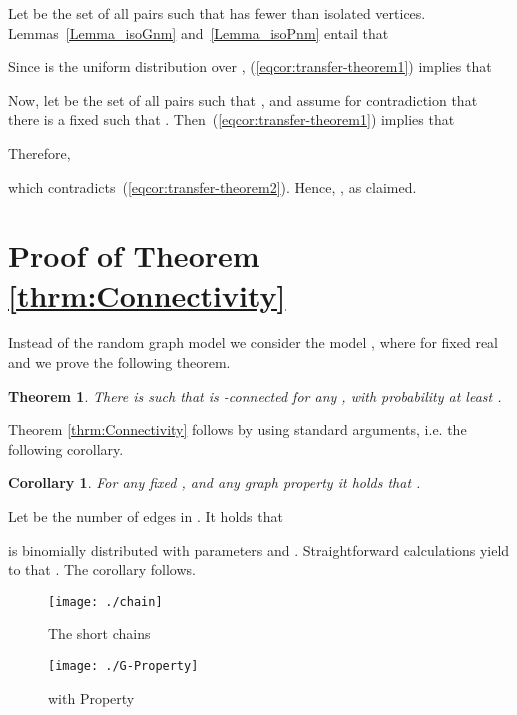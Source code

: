 \documentclass[a4paper,10pt]{article}
\makeatletter
\newcommand{\qed}{\hfill\smallskip}
\newtheorem{corollary}{Corollary}\renewcommand{\thecorollary}{\arabic{corollary}}
\newtheorem{theorem}{Theorem}\renewcommand{\thetheorem}{\arabic{theorem}}
\newenvironment{proof}{\noindent{\bf Proof\@:}}{\hfill \\}
\newcommand\Lem{Lemma}
\makeatother
\begin{document}
Let  be the set of all pairs 
such that  has fewer than  isolated vertices. \Lem s~\ref{Lemma_isoGnm} and~\ref{Lemma_isoPnm} entail that 

Since  is the uniform distribution over ,
(\ref{eqcor:transfer-theorem1}) implies that 

Now, let  be the set of all pairs
 such that 	,
and assume for contradiction that there is a fixed  such
that . Then~(\ref{eqcor:transfer-theorem1})
implies that

Therefore,

which contradicts~(\ref{eqcor:transfer-theorem2}). Hence, ,
as claimed.
\qed








\section{Proof of Theorem \ref{thrm:Connectivity}}\label{section:thrm:Connectivity}


Instead of the random graph model   we consider the model , 
where  for fixed real  and we prove the following theorem.

\begin{theorem}\label{thrm:ConnectivityGnp}
There is  such that  is -connected 
for any , with probability at least 
.
\end{theorem}

\noindent
Theorem \ref{thrm:Connectivity} follows by using standard arguments, i.e. the following corollary.
\begin{corollary}
For any fixed ,  and any graph property  it holds that
.
\end{corollary}  
\begin{proof}
Let  be the number of edges in . It holds that

 is binomially distributed with parameters  and .
Straightforward calculations yield to that .
The corollary follows.
\end{proof}



\begin{figure}
\begin{minipage}{0.5\textwidth}
	\centering
		\texttt{[image: ./chain]}
	\caption{ The short chains}
	\label{fig:Chains}
\end{minipage}
\begin{minipage}{0.5\textwidth}
	\centering
		\texttt{[image: ./G-Property]}
	\caption{  with Property  }
	\label{fig:G-Property}
\end{minipage}
\end{figure}
\end{document}
